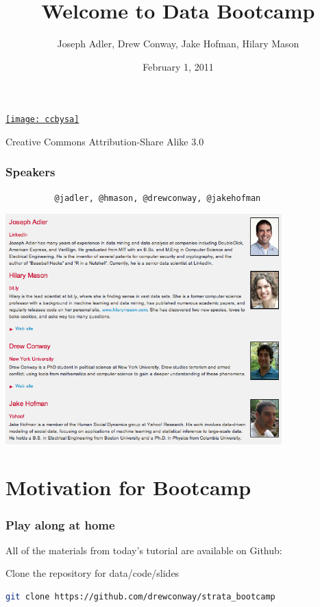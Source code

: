 \documentclass[xcolor=dvipsnames, 9pt]{beamer}
\title{Welcome to Data Bootcamp}
\author{Joseph Adler, Drew Conway, Jake Hofman, Hilary Mason}
\date{February 1, 2011}
\begin{document}
 
    
\begin{frame}[plain]
  \titlepage 

  \tiny
  \href{http://creativecommons.org/licenses/by-sa/3.0/us/}{\texttt{[image: ccbysa]}}

  Creative Commons Attribution-Share Alike 3.0
\end{frame}


\begin{frame}[fragile]
    \frametitle{Speakers}
\begin{verbatim}
          @jadler, @hmason, @drewconway, @jakehofman
\end{verbatim}
    \vskip5pt
    \begin{center}
        \includegraphics[width=0.8\textwidth]{speakers.png} \\
    \end{center}
\end{frame}


\section{Motivation for Bootcamp} %
\label{sec:motivation_for_bootcamp}

\begin{frame}[fragile]
    \frametitle{Play along at home}
    All of the materials from today's tutorial are available on Github:
    \vskip20pt
    \begin{block}{Clone the repository for data/code/slides}
        \begin{lstlisting}[language=bash]
git clone https://github.com/drewconway/strata_bootcamp
        \end{lstlisting}
    \end{block}
\end{frame}
\end{document}
